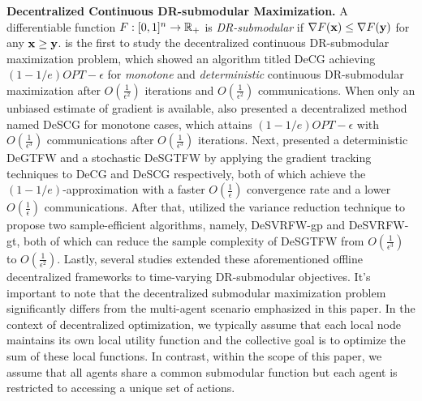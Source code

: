 \textbf{Decentralized Continuous DR-submodular Maximization.} A differentiable function $F:[0,1]^{n}\rightarrow\mathbb{R}_{+}$ is {\it DR-submodular} if $\nabla F(\mathbf{x})\le\nabla F(\mathbf{y})$ for any $\mathbf{x}\ge\mathbf{y}$. \cite{mokhtari2018decentralized} is the first to study the decentralized continuous DR-submodular maximization problem, which showed an algorithm titled DeCG achieving $(1-1/e)OPT-\epsilon$ 
 for \emph{monotone} and \textit{deterministic}  continuous DR-submodular maximization after $O(\frac{1}{\epsilon^{2}})$ iterations  and $O(\frac{1}{\epsilon^{2}})$ communications.  When only an unbiased estimate of gradient is available, \cite{mokhtari2018decentralized}  also presented a decentralized method named DeSCG for monotone cases, which attains $(1-1/e)OPT-\epsilon$ with $O(\frac{1}{\epsilon^{3}})$ communications after $O(\frac{1}{\epsilon^{3}})$ iterations. Next, \cite{xie2019decentralized} presented a deterministic DeGTFW and a stochastic DeSGTFW by applying the gradient tracking techniques\citep{pu2021distributed2}  to DeCG and  DeSCG respectively,  both of which achieve the $(1-1/e)$-approximation with a faster $O(\frac{1}{\epsilon})$ convergence rate and a lower $O(\frac{1}{\epsilon})$ communications. After that, \cite{gao2023convergence} utilized the  variance reduction technique\citep{fang2018spider} to propose two sample-efficient algorithms, namely, DeSVRFW-gp and DeSVRFW-gt, both of which can reduce the sample complexity of DeSGTFW from $O(\frac{1}{\epsilon^{3}})$ to  $O(\frac{1}{\epsilon^{2}})$. Lastly, several studies\citep{zhu2021projection,zhang2023communication,liao2023improved} extended these aforementioned offline decentralized frameworks to time-varying DR-submodular objectives. It's important to note that the decentralized submodular maximization problem  significantly differs from the multi-agent scenario emphasized in this paper. In the context of decentralized optimization, we typically assume that each local node maintains its own local utility function and the collective goal is to optimize the sum of these local functions. In contrast, within the scope of this paper, we assume that all agents share a common submodular function but each agent is restricted to accessing a unique set of actions.
 
